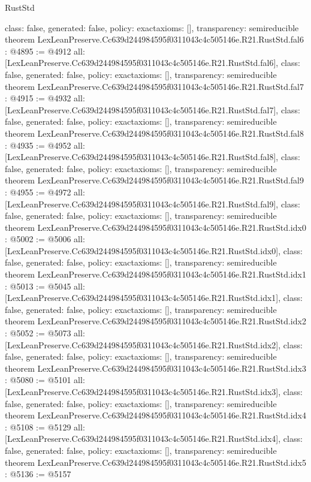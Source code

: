 \begin{lexlean}{RustStd}
\begin{coremodule}
{  class: false,
  generated: false,
  policy: exact{axioms: []},
  transparency: semireducible
}
theorem LexLeanPreserve.Cc639d244984595f0311043c4c505146e.R21.RustStd.fal6 : @4895 := @4912 {
  all: [LexLeanPreserve.Cc639d244984595f0311043c4c505146e.R21.RustStd.fal6],
  class: false,
  generated: false,
  policy: exact{axioms: []},
  transparency: semireducible
}
theorem LexLeanPreserve.Cc639d244984595f0311043c4c505146e.R21.RustStd.fal7 : @4915 := @4932 {
  all: [LexLeanPreserve.Cc639d244984595f0311043c4c505146e.R21.RustStd.fal7],
  class: false,
  generated: false,
  policy: exact{axioms: []},
  transparency: semireducible
}
theorem LexLeanPreserve.Cc639d244984595f0311043c4c505146e.R21.RustStd.fal8 : @4935 := @4952 {
  all: [LexLeanPreserve.Cc639d244984595f0311043c4c505146e.R21.RustStd.fal8],
  class: false,
  generated: false,
  policy: exact{axioms: []},
  transparency: semireducible
}
theorem LexLeanPreserve.Cc639d244984595f0311043c4c505146e.R21.RustStd.fal9 : @4955 := @4972 {
  all: [LexLeanPreserve.Cc639d244984595f0311043c4c505146e.R21.RustStd.fal9],
  class: false,
  generated: false,
  policy: exact{axioms: []},
  transparency: semireducible
}
theorem LexLeanPreserve.Cc639d244984595f0311043c4c505146e.R21.RustStd.idx0 : @5002 := @5006 {
  all: [LexLeanPreserve.Cc639d244984595f0311043c4c505146e.R21.RustStd.idx0],
  class: false,
  generated: false,
  policy: exact{axioms: []},
  transparency: semireducible
}
theorem LexLeanPreserve.Cc639d244984595f0311043c4c505146e.R21.RustStd.idx1 : @5013 := @5045 {
  all: [LexLeanPreserve.Cc639d244984595f0311043c4c505146e.R21.RustStd.idx1],
  class: false,
  generated: false,
  policy: exact{axioms: []},
  transparency: semireducible
}
theorem LexLeanPreserve.Cc639d244984595f0311043c4c505146e.R21.RustStd.idx2 : @5052 := @5073 {
  all: [LexLeanPreserve.Cc639d244984595f0311043c4c505146e.R21.RustStd.idx2],
  class: false,
  generated: false,
  policy: exact{axioms: []},
  transparency: semireducible
}
theorem LexLeanPreserve.Cc639d244984595f0311043c4c505146e.R21.RustStd.idx3 : @5080 := @5101 {
  all: [LexLeanPreserve.Cc639d244984595f0311043c4c505146e.R21.RustStd.idx3],
  class: false,
  generated: false,
  policy: exact{axioms: []},
  transparency: semireducible
}
theorem LexLeanPreserve.Cc639d244984595f0311043c4c505146e.R21.RustStd.idx4 : @5108 := @5129 {
  all: [LexLeanPreserve.Cc639d244984595f0311043c4c505146e.R21.RustStd.idx4],
  class: false,
  generated: false,
  policy: exact{axioms: []},
  transparency: semireducible
}
theorem LexLeanPreserve.Cc639d244984595f0311043c4c505146e.R21.RustStd.idx5 : @5136 := @5157 {
}
\end{coremodule}
\end{lexlean}

